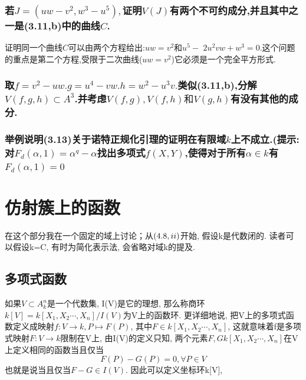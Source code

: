 \documentclass[UTF8]{book}
\begin{document}
			
			
		\subsection{若$J =\left( uw - v ^{2}, w ^{3}- u ^{5}\right),$证明$V ( J )$有两个不可约成分,并且其中之一是(3.11,b)中的曲线$ C $.}
		证明同一个曲线$ C $可以由两个方程给出:$u w=v^{2}$和$u^{5}-$ $2 u^{2} v w+w^{3}=0 .$这个问题的重点是第二个方程,受限于二次曲线($u w=v^{2}$)它必须是一个完全平方形式.
		 
		
		
		\subsection{取$f=v^{2}-u w . g=u^{4}-v w . h=w^{2}-u^{3} v .$类似(3.11,b),分解$V(f, g, h) \subset A^{3}$.并考虑$V(f, g), V(f, h) \text {和} V(g, h)$有没有其他的成分.}
		
		
		\subsection{举例说明(3.13)关于诺特正规化引理的证明在有限域$ k $上不成立.(提示:对$ F_{d}(\alpha,1) = \alpha^{q}-\alpha$找出多项式$ f(X,Y) $,使得对于所有$ \alpha \in k $有$ F_{d}(\alpha,1)=0 $}
		
		
\chapter{仿射簇上的函数}
	\indent 在这个部分我在一个固定的域上讨论；从$(4.8, \romannumeral2)$开始, 假设k是代数闭的. 读者可以假设k=C, 有时为简化表示法, 会省略对域k的提及.

		\section{多项式函数} 如果$V\subset A^{n}_{k}$是一个代数集, I(V)是它的理想, 那么称商环$k[V]=k[X_{1},X_{2}\cdots,X_{n}]/I(V)$为V上的函数环. 更详细地说, 把V上的多项式函数定义成映射$f:V\rightarrow k, P\mapsto F(P)$, 其中$F\in k[X_{1},X_{2}\cdots,X_{n}]$, 这就意味着f是多项式映射$F:V\rightarrow k$限制在V上, 由I(V)的定义只知, 两个元素$F,G k[X_{1},X_{2}\cdots,X_{n}]$在V上定义相同的函数当且仅当
		\begin{equation*}
		F(P)-G(P)=0, \forall  P\in V
		\end{equation*}
		也就是说当且仅当$F-G\in I(V)$. 因此可以定义坐标环k[V],
\end{document}
